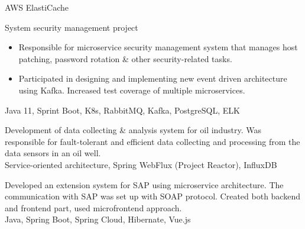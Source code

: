 \documentclass[10pt,a4paper,ragged2e,withhyper]{altacv}
\begin{document}
\begin{paracol}{2}


AWS ElastiCache

\divider


System security management project
\begin{itemize}
\item Responsible for microservice security management system that manages host patching, password rotation \& other security-related tasks.
\item Participated in designing and implementing new event driven architecture using Kafka. Increased test coverage of multiple microservices.
\end{itemize}
Java 11, Sprint Boot, K8s, RabbitMQ, Kafka, PostgreSQL, ELK

\divider


Development of data collecting \& analysis system for oil industry. Was responsible for fault-tolerant and efficient data collecting and processing from the data sensors in an oil well.\\
Service-oriented architecture, Spring WebFlux (Project Reactor), InfluxDB

\divider


Developed an extension system for SAP using microservice architecture. The communication with SAP was set up with SOAP protocol. Created both backend and frontend part, used microfrontend approach.\\
Java, Spring Boot, Spring Cloud, Hibernate, Vue.js

\switchcolumn


\end{paracol}
\end{document}

